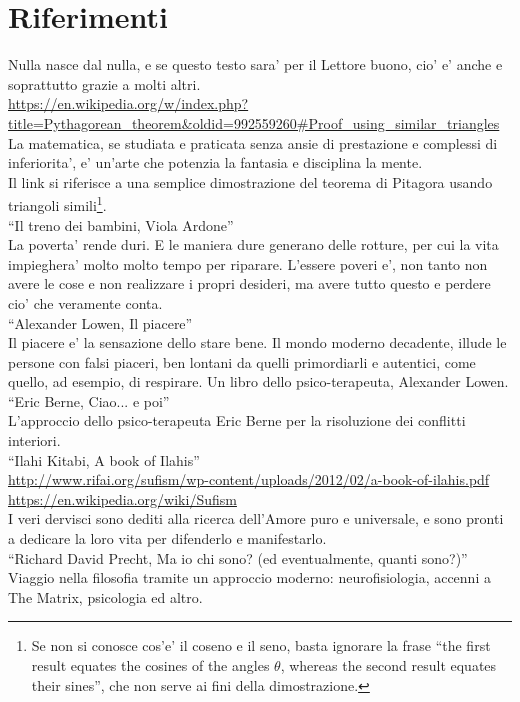 \chapter{Riferimenti}
\label{chapRiferimenti}

Nulla nasce dal nulla, e se questo testo sara' per il Lettore buono, cio' e' anche e soprattutto grazie a molti altri.\\


    \url{https://en.wikipedia.org/w/index.php?title=Pythagorean\_theorem&oldid=992559260\#Proof\_using\_similar\_triangles}\\
  La matematica, se studiata e praticata senza ansie di prestazione e complessi di inferiorita',
  e' un'arte che potenzia la fantasia e disciplina la mente.\\
  Il link si riferisce a una semplice dimostrazione del teorema di Pitagora usando triangoli simili\footnote{Se non si conosce cos'e' il coseno e il seno, basta ignorare la frase ``the first result equates the cosines of the angles $\theta$, whereas the second result equates their sines'', che non serve ai fini della dimostrazione.}.\\

  ``Il treno dei bambini, Viola Ardone''\\
  La poverta' rende duri. E le maniera dure generano delle rotture, per cui la vita impieghera'
  molto molto tempo per riparare. L'essere poveri e', non tanto non avere le cose e non realizzare
  i propri desideri, ma avere tutto questo e perdere cio' che veramente conta.\\

  ``Alexander Lowen, Il piacere''\\
  Il piacere e' la sensazione dello stare bene. Il mondo moderno decadente, illude le persone
  con falsi piaceri, ben lontani da quelli primordiarli e autentici, come quello, ad esempio,
  di respirare. Un libro dello psico-terapeuta, Alexander Lowen.\\
  
  ``Eric Berne, Ciao... e poi''\\
  L'approccio dello psico-terapeuta Eric Berne per la risoluzione dei conflitti interiori.\\

  
  ``Ilahi Kitabi, A book of Ilahis''\\
  \url{http://www.rifai.org/sufism/wp-content/uploads/2012/02/a-book-of-ilahis.pdf}\\
  \url{https://en.wikipedia.org/wiki/Sufism}\\
  I veri dervisci sono dediti alla ricerca dell'Amore puro e universale, e sono pronti a
  dedicare la loro vita per difenderlo e manifestarlo.\\

  ``Richard David Precht, Ma io chi sono? (ed eventualmente, quanti sono?)''\\
  Viaggio nella filosofia tramite un approccio moderno: neurofisiologia, accenni a The Matrix, psicologia ed altro.
   
